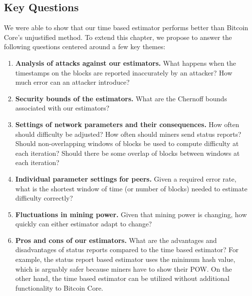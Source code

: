 \subsection{Key Questions}
We were able to show that our time based estimator performs better than Bitcoin Core's unjustified method. To extend this chapter, we propose to answer the following questions centered around a few key themes:
\begin{enumerate}
\item \textbf{Analysis of attacks against our estimators.} What happens when the timestamps on the blocks are reported inaccurately by an attacker? How much error can an attacker introduce?
\item \textbf{Security bounds of the estimators.} What are the Chernoff bounds associated with our estimators?
\item \textbf{Settings of network parameters and their consequences.} How often should difficulty be adjusted? How often should miners send status reports? Should non-overlapping windows of blocks be used to compute difficulty at each iteration? Should there be some overlap of blocks between windows at each iteration?
\item \textbf{Individual parameter settings for peers.} Given a required error rate, what is the shortest window of time (or number of blocks) needed to estimate difficulty correctly?
\item \textbf{Fluctuations in mining power.} Given that mining power is changing, how quickly can either estimator adapt to change?
\item \textbf{Pros and cons of our estimators.} What are the advantages and disadvantages of status reports compared to the time based estimator? For example, the status report based estimator uses the minimum hash value, which is arguably safer because miners have to show their POW. On the other hand, the time based estimator can be utilized without additional functionality to Bitcoin Core.
\end{enumerate}


%
